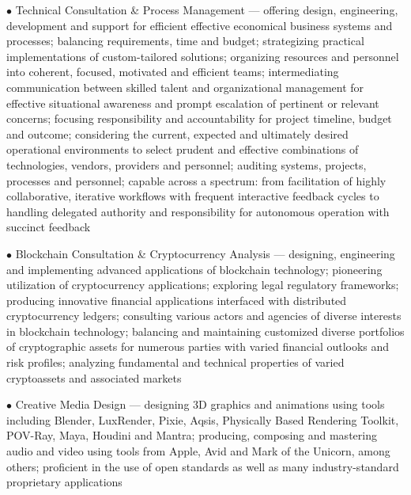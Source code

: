 {{		\hfil%
		\par%
		\smallskip%
		\item{$\bullet$}%
		{%
			\mylilcsc%
			Technical Consultation \& Process Management %
		}%
		--- offering design, engineering, development and support for efficient effective economical business systems and processes; balancing requirements, time and budget; strategizing practical implementations of custom-tailored solutions; organizing resources and personnel into coherent, focused, motivated and efficient teams; intermediating communication between skilled talent and organizational management for effective situational awareness and prompt escalation of pertinent or relevant concerns; focusing responsibility and accountability for project timeline, budget and outcome; considering the current, expected and ultimately desired operational environments to select prudent and effective combinations of technologies, vendors, providers and personnel; auditing systems, projects, processes and personnel; capable across a spectrum: from facilitation of highly collaborative, iterative workflows with frequent interactive feedback cycles to handling delegated authority and responsibility for autonomous operation with succinct feedback%
		\hfil%
		\par%
		\smallskip%
		\item{$\bullet$}%
		{%
			\mylilcsc%
			Blockchain Consultation \& Cryptocurrency Analysis %
		}%
		--- designing, engineering and implementing advanced applications of blockchain technology; pioneering utilization of cryptocurrency applications; exploring legal regulatory frameworks; producing innovative financial applications interfaced with distributed cryptocurrency ledgers; consulting various actors and agencies of diverse interests in blockchain technology; balancing and maintaining customized diverse portfolios of cryptographic assets for numerous parties with varied financial outlooks and risk profiles; analyzing fundamental and technical properties of varied cryptoassets and associated markets%
		\hfil%
		\par%
		\smallskip%
		\item{$\bullet$}%
		{%
			\mylilcsc%
			Creative Media Design %
		}%
		--- designing 3D graphics and animations using tools including Blender, LuxRender, Pixie, Aqsis, Physically Based Rendering Toolkit, POV-Ray, Maya, Houdini and Mantra; producing, composing and mastering audio and video using tools from Apple, Avid and Mark of the Unicorn, among others; proficient in the use of open standards as well as many industry-standard proprietary applications%
		\hfil%
	}%
}%
